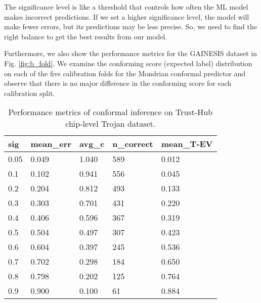 \documentclass[9pt,conference]{IEEEtran}
\begin{document}

The significance level is like a threshold that controls how often the ML model makes incorrect predictions. If we set a higher significance level, the model will make fewer errors, but its predictions may be less precise. So, we need to find the right balance to get the best results from our model.

Furthermore, we also show the performance metrics for the GAINESIS dataset in Fig. \ref{fig:b_fold}. We examine the conforming score (expected label) distribution on each of the five calibration folds for the Mondrian conformal predictor and observe that there is no major difference in the conforming score for each calibration split.

\begin{table}[t]
\centering
\caption{Performance metrics of conformal inference on Trust-Hub chip-level Trojan dataset.}
\begin{tabular}{lllll}
\hline
\textbf{sig} & \textbf{mean\_err} & \textbf{avg\_c} & \textbf{n\_correct} & \textbf{mean\_T-EV} \\ \hline
0.05         & 0.049                 & 1.040           & 589                 & 0.012               \\ \hline
0.1          & 0.102                 & 0.941           & 556               & 0.045               \\ \hline
0.2          & 0.204                 & 0.812           & 493             & 0.133               \\ \hline
0.3          & 0.303                 & 0.701           & 431             & 0.220               \\ \hline
0.4          & 0.406                 & 0.596           & 367            & 0.319               \\ \hline
0.5          & 0.504                 & 0.497           & 307           & 0.423               \\ \hline
0.6          & 0.604                 & 0.397           & 245             & 0.536               \\ \hline
0.7          & 0.702                 & 0.298           & 184            & 0.650               \\ \hline
0.8          & 0.798                 & 0.202           & 125           & 0.764               \\ \hline
0.9          & 0.900                 & 0.100           & 61         & 0.884               \\ \hline
\end{tabular}
\label{tab:performance}
\end{table}
\end{document}
